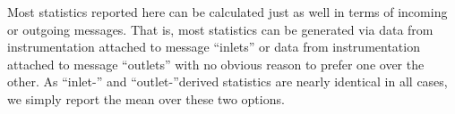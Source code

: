 Most statistics reported here can be calculated just as well in terms of incoming or outgoing messages.
That is, most statistics can be generated via data from instrumentation attached to message ``inlets'' or data from instrumentation attached to message ``outlets'' with no obvious reason to prefer one over the other.
As ``inlet-'' and ``outlet-''derived statistics are nearly identical in all cases, we simply report the mean over these two options.
